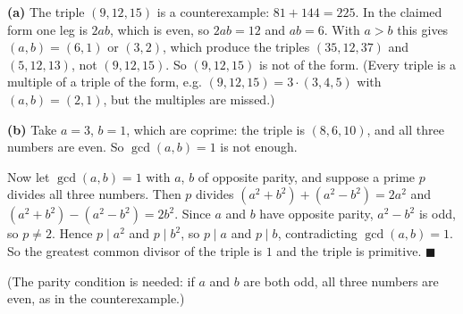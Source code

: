 \textbf{(a)} The triple $(9,12,15)$ is a counterexample: $81+144=225$. In the claimed form one leg is $2ab$, which is even, so $2ab=12$ and $ab=6$. With $a>b$ this gives $(a,b)=(6,1)$ or $(3,2)$, which produce the triples $(35,12,37)$ and $(5,12,13)$, not $(9,12,15)$. So $(9,12,15)$ is not of the form. (Every triple is a multiple of a triple of the form, e.g. $(9,12,15)=3\cdot(3,4,5)$ with $(a,b)=(2,1)$, but the multiples are missed.)

\textbf{(b)} Take $a=3$, $b=1$, which are coprime: the triple is $(8,6,10)$, and all three numbers are even. So $\gcd(a,b)=1$ is not enough.

Now let $\gcd(a,b)=1$ with $a$, $b$ of opposite parity, and suppose a prime $p$ divides all three numbers. Then $p$ divides $\left(a^2+b^2\right)+\left(a^2-b^2\right)=2a^2$ and $\left(a^2+b^2\right)-\left(a^2-b^2\right)=2b^2$. Since $a$ and $b$ have opposite parity, $a^2-b^2$ is odd, so $p\ne2$. Hence $p\mid a^2$ and $p\mid b^2$, so $p\mid a$ and $p\mid b$, contradicting $\gcd(a,b)=1$. So the greatest common divisor of the triple is $1$ and the triple is primitive. $\blacksquare$

(The parity condition is needed: if $a$ and $b$ are both odd, all three numbers are even, as in the counterexample.)
